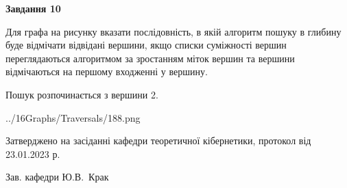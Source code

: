 \documentclass[12pt, ukrainian]{article}
\begin{document}
{\begin {large}
{\begin {center}\textbf{Завдання 10}\end {center}}\par
Для графа на рисунку вказати послідовність, в якій алгоритм пошуку в глибину буде відмічати відвідані вершини, якщо списки суміжності вершин переглядаються алгоритмом за зростанням міток вершин та вершини відмічаються на першому вход\-женні у вершину.\par
Пошук розпочинається з вершини 2.\par

\begin{center}
	{../16Graphs/Traversals/188.png}
\end{center}\par
\newpage


\end {large}
}
{\smallskip \begin {small} Затверджено на засіданні кафедри теоретичної кібернетики, протокол  від   23.01.2023 р.\par\smallskip\smallskip
{\parbox {6.5 cm}{Зав. кафедри \dotfill Ю.В.~Крак}} \end{small}}
\end{document}
